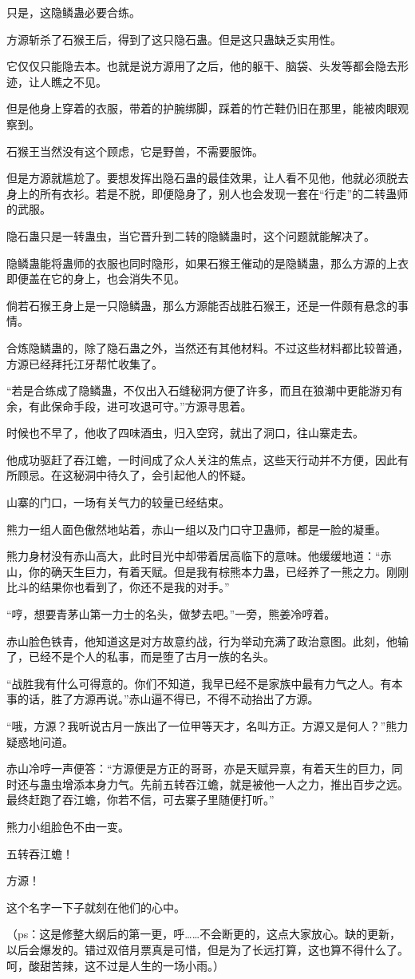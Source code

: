 \begin{this_body}
只是，这隐鳞蛊必要合练。

方源斩杀了石猴王后，得到了这只隐石蛊。但是这只蛊缺乏实用性。

它仅仅只能隐去本。也就是说方源用了之后，他的躯干、脑袋、头发等都会隐去形迹，让人瞧之不见。

但是他身上穿着的衣服，带着的护腕绑脚，踩着的竹芒鞋仍旧在那里，能被肉眼观察到。

石猴王当然没有这个顾虑，它是野兽，不需要服饰。

但是方源就尴尬了。要想发挥出隐石蛊的最佳效果，让人看不见他，他就必须脱去身上的所有衣衫。若是不脱，即便隐身了，别人也会发现一套在“行走”的二转蛊师的武服。

隐石蛊只是一转蛊虫，当它晋升到二转的隐鳞蛊时，这个问题就能解决了。

隐鳞蛊能将蛊师的衣服也同时隐形，如果石猴王催动的是隐鳞蛊，那么方源的上衣即便盖在它的身上，也会消失不见。

倘若石猴王身上是一只隐鳞蛊，那么方源能否战胜石猴王，还是一件颇有悬念的事情。

合炼隐鳞蛊的，除了隐石蛊之外，当然还有其他材料。不过这些材料都比较普通，方源已经拜托江牙帮忙收集了。

“若是合练成了隐鳞蛊，不仅出入石缝秘洞方便了许多，而且在狼潮中更能游刃有余，有此保命手段，进可攻退可守。”方源寻思着。

时候也不早了，他收了四味酒虫，归入空窍，就出了洞口，往山寨走去。

他成功驱赶了吞江蟾，一时间成了众人关注的焦点，这些天行动并不方便，因此有所顾忌。在这秘洞中待久了，会引起他人的怀疑。

山寨的门口，一场有关气力的较量已经结束。

熊力一组人面色傲然地站着，赤山一组以及门口守卫蛊师，都是一脸的凝重。

熊力身材没有赤山高大，此时目光中却带着居高临下的意味。他缓缓地道：“赤山，你的确天生巨力，有着天赋。但是我有棕熊本力蛊，已经养了一熊之力。刚刚比斗的结果你也看到了，你还不是我的对手。”

“哼，想要青茅山第一力士的名头，做梦去吧。”一旁，熊姜冷哼着。

赤山脸色铁青，他知道这是对方故意约战，行为举动充满了政治意图。此刻，他输了，已经不是个人的私事，而是堕了古月一族的名头。

“战胜我有什么可得意的。你们不知道，我早已经不是家族中最有力气之人。有本事的话，胜了方源再说。”赤山逼不得已，不得不动抬出了方源。

“哦，方源？我听说古月一族出了一位甲等天才，名叫方正。方源又是何人？”熊力疑惑地问道。

赤山冷哼一声便答：“方源便是方正的哥哥，亦是天赋异禀，有着天生的巨力，同时还与蛊虫增添本身力气。先前五转吞江蟾，就是被他一人之力，推出百步之远。最终赶跑了吞江蟾，你若不信，可去寨子里随便打听。”

熊力小组脸色不由一变。

五转吞江蟾！

方源！

这个名字一下子就刻在他们的心中。

（ps：这是修整大纲后的第一更，呼……不会断更的，这点大家放心。缺的更新，以后会爆发的。错过双倍月票真是可惜，但是为了长远打算，这也算不得什么了。呵，酸甜苦辣，这不过是人生的一场小雨。）

\end{this_body}

